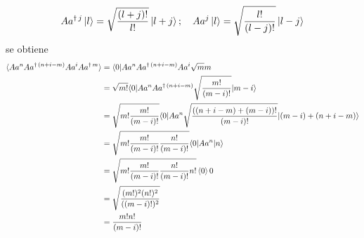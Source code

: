 \begin{enumerate}
        \begin{equation}
          A{a}^{\dagger\,j} \ket{l} = \sqrt{\frac{(l+j)!}{l!}} \ket{l+j}; \quad A{a}^{j}\ket{l}=\sqrt{\frac{l!}{(l-j)!}}\ket{l-j} \label{eq:9-3}
        \end{equation}
        se obtiene
        \begin{align*}
          \langle A{a}^{n} A{a}^{\dagger\,(n+i-m)} A{a}^{i} A{a}^{\dagger\,m} \rangle & = \langle 0 \vert A{a}^{n} A{a}^{\dagger\,(n+i-m)} A{a}^{i} \sqrt{m}{m}                                               \\
                                                                                                  & = \sqrt{m!} \langle 0 \vert A{a}^{n} A{a}^{\dagger\,(n+i-m)} \sqrt{\frac{m!}{(m-i)!}} \vert m-i \rangle                  \\
                                                                                                  & = \sqrt{m!\frac{m!}{(m-i)!}} \langle 0 \vert A{a}^{n} \sqrt{\frac{((n+i-m) + (m-i))!}{(m-i)!}} \vert (m-i) + (n+i-m)\rangle \\
                                                                                                  & = \sqrt{m! \frac{m!}{(m-i)!} \frac{n!}{(m-i)!}} \langle 0 \vert A{a}^{n} \vert n\rangle                                     \\
                                                                                                  & = \sqrt{m! \frac{m!}{(m-i)!} \frac{n!}{(m-i)!} n!} \braket{0}{0}                                                               \\
                                                                                                  & = \sqrt{\frac{(m!)^2 (n!)^2}{((m-i)!)^2}}                                                                                      \\
                                                                                                  & = \frac{m!n!}{(m-i)!}
        \end{align*}


\end{enumerate}
